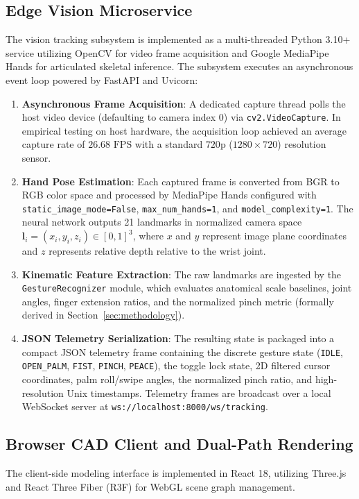 \subsection{Edge Vision Microservice}
The vision tracking subsystem is implemented as a multi-threaded Python 3.10+ service utilizing OpenCV for video frame acquisition and Google MediaPipe Hands for articulated skeletal inference. The subsystem executes an asynchronous event loop powered by FastAPI and Uvicorn:

\begin{enumerate}
    \item \textbf{Asynchronous Frame Acquisition}: A dedicated capture thread polls the host video device (defaulting to camera index 0) via \texttt{cv2.VideoCapture}. In empirical testing on host hardware, the acquisition loop achieved an average capture rate of $26.68\text{ FPS}$ with a standard $720\text{p}$ ($1280 \times 720$) resolution sensor.
    \item \textbf{Hand Pose Estimation}: Each captured frame is converted from BGR to RGB color space and processed by MediaPipe Hands configured with \texttt{static\_image\_mode=False}, \texttt{max\_num\_hands=1}, and \texttt{model\_complexity=1}. The neural network outputs 21 landmarks in normalized camera space $\mathbf{l}_i = (x_i, y_i, z_i) \in [0, 1]^3$, where $x$ and $y$ represent image plane coordinates and $z$ represents relative depth relative to the wrist joint.
    \item \textbf{Kinematic Feature Extraction}: The raw landmarks are ingested by the \texttt{GestureRecognizer} module, which evaluates anatomical scale baselines, joint angles, finger extension ratios, and the normalized pinch metric (formally derived in Section~\ref{sec:methodology}).
    \item \textbf{JSON Telemetry Serialization}: The resulting state is packaged into a compact JSON telemetry frame containing the discrete gesture state (\texttt{IDLE}, \texttt{OPEN\_PALM}, \texttt{FIST}, \texttt{PINCH}, \texttt{PEACE}), the toggle lock state, 2D filtered cursor coordinates, palm roll/swipe angles, the normalized pinch ratio, and high-resolution Unix timestamps. Telemetry frames are broadcast over a local WebSocket server at \texttt{ws://localhost:8000/ws/tracking}.
\end{enumerate}

\subsection{Browser CAD Client and Dual-Path Rendering}
The client-side modeling interface is implemented in React 18, utilizing Three.js and React Three Fiber (R3F) for WebGL scene graph management.

